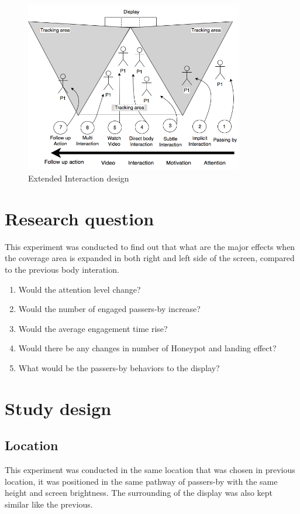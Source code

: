 \begin{figure}[H]
    \centering
    \includegraphics[width=0.85\textwidth,height=7.5cm]{Figures/9/enhanced_interaction_design}
    \caption{Extended Interaction design}%
    \label{fig:KinectExtended}%
\end{figure}




\section{Research question}
This experiment was conducted to find out that what are the major effects when the coverage area is expanded in both right and left side of the screen, compared to the previous body interation.

\begin{enumerate}
\item Would the attention level change?
\item Would the number of engaged passers-by increase?
\item Would the average engagement time rise?
\item Would there be any changes in number of Honeypot and landing effect?
\item What would be the passers-by behaviors to the display?
\end{enumerate}



\section{Study design}

\subsection{Location}
This experiment was conducted in the same location that was chosen in previous location, it was positioned in the same pathway of passers-by with the same height and screen brightness.  The surrounding of the display was also kept similar like the previous. 

